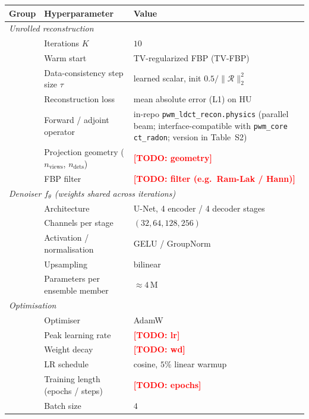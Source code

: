 \documentclass{article}
\newcommand{\todo}[1]{\textcolor{red}{\textbf{[TODO: #1]}}}
\begin{document}
\begin{table}[h]
  \centering
  \small
  \begin{tabular}{lll}
    \toprule
    \textbf{Group} & \textbf{Hyperparameter} & \textbf{Value} \\
    \midrule
    \multicolumn{3}{l}{\emph{Unrolled reconstruction}} \\
    & Iterations $K$                       & $10$ \\
    & Warm start                           & TV-regularized FBP (TV-FBP) \\
    & Data-consistency step size $\tau$    & learned scalar, init $0.5/\|\mathcal{R}\|_2^2$ \\
    & Reconstruction loss                  & mean absolute error (L1) on HU \\
    & Forward / adjoint operator           & in-repo \texttt{pwm\_ldct\_recon.physics} (parallel beam; interface-compatible with \texttt{pwm\_core ct\_radon}; version in Table~S2) \\
    & Projection geometry ($n_\text{views}$, $n_\text{dets}$) & \todo{geometry} \\
    & FBP filter                           & \todo{filter (e.g.\ Ram-Lak / Hann)} \\
    \midrule
    \multicolumn{3}{l}{\emph{Denoiser $f_\theta$ (weights shared across iterations)}} \\
    & Architecture                         & U-Net, 4 encoder / 4 decoder stages \\
    & Channels per stage                   & $(32, 64, 128, 256)$ \\
    & Activation / normalisation           & GELU / GroupNorm \\
    & Upsampling                           & bilinear \\
    & Parameters per ensemble member       & $\approx 4$\,M \\
    \midrule
    \multicolumn{3}{l}{\emph{Optimisation}} \\
    & Optimiser                            & AdamW \\
    & Peak learning rate                   & \todo{lr} \\
    & Weight decay                         & \todo{wd} \\
    & LR schedule                          & cosine, $5\%$ linear warmup \\
    & Training length (epochs / steps)     & \todo{epochs} \\
    & Batch size                           & $4$ \\

\end{tabular}
\end{table}
\end{document}
